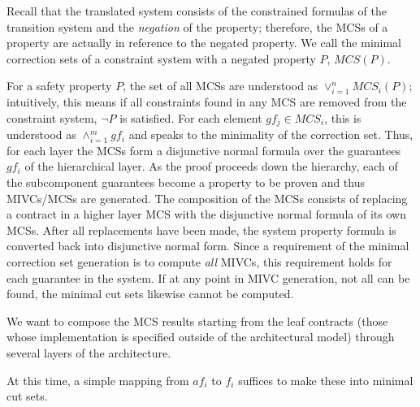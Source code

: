 Recall that the translated system consists of the constrained formulas of the transition system and the {\em negation} of the property; therefore, the MCSs of a property are actually in reference to the negated property. We call the minimal correction sets of a constraint system with a negated property $P$, $MCS(P)$. 

For a safety property $P$, the set of all MCSs are understood as $\lor^{n}_{i=1} MCS_i(P)$; intuitively, this means if all constraints found in any MCS are removed from the constraint system, $\neg P$ is satisfied. For each element $gf_j \in MCS_i$, this is understood as $\land^{m}_{i=1} gf_i$ and speaks to the minimality of the correction set. Thus, for each layer the MCSs form a disjunctive normal formula over the guarantees $gf_i$ of the hierarchical layer. As the proof proceeds down the hierarchy, each of the subcomponent guarantees become a property to be proven and thus MIVCs/MCSs are generated. The composition of the MCSs consists of replacing a contract in a higher layer MCS with the disjunctive normal formula of its own MCSs. After all replacements have been made, the system property formula is converted back into disjunctive normal form. Since a requirement of the minimal correction set generation is to compute {\em all} MIVCs, this requirement holds for each guarantee in the system. If at any point in MIVC generation, not all can be found, the minimal cut sets likewise cannot be computed.

We want to compose the MCS results starting from the leaf contracts (those whose implementation is specified outside of the architectural model) through several layers of the architecture. 


At this time, a simple mapping from $af_i$ to $f_i$ suffices to make these into minimal cut sets.


